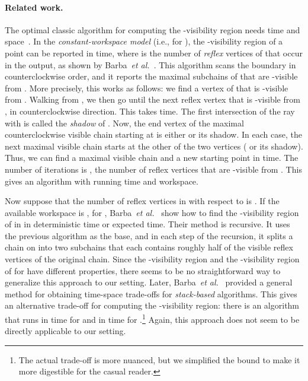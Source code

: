 \documentclass[11pt, a4paper]{article}
\newcommand{\etal}{\emph{et al.}\xspace}
\begin{document}
\paragraph{Related work.}
The optimal classic algorithm for computing the 
-visibility region needs  time and  
space~\cite{joe1987corrections}. In the 
\emph{constant-workspace model} (i.e., for ), the
-visibility region of a point  can
be reported in  time, where 
 is the number of \emph{reflex} vertices 
of  that occur in the output,
as shown by Barba~\etal~\cite{barba2014computing}.
This algorithm scans the boundary 
in counterclockwise order, and it reports the 
maximal subchains of  that are 
-visible from . More precisely, this 
works as follows: we find a vertex
 of  that is -visible 
from . Walking from , we 
then go until the next reflex vertex
 that is -visible from ,
in counterclockwise direction.
This takes  time. The first intersection 
of the ray  with  is 
called the \emph{shadow} of . 
Now, the end vertex of the maximal counterclockwise 
visible chain starting at  is either 
 or its shadow. In each case, 
the next maximal visible chain starts at the other
of the two vertices ( or its shadow). Thus, we  can
find a maximal visible chain and a new starting 
point in  time. 
The number of iterations is , the number 
of reflex vertices that are -visible from .
This gives an algorithm with  running 
time and  workspace. 

Now suppose that the number of reflex vertices in
 with respect to  is . If the 
available workspace is , for 
, Barba~\etal~\cite{barba2014computing} 
show how to find the -visibility region 
of  in  in  
deterministic time or  
expected time. Their method is recursive. 
It uses the previous algorithm as the base,
and in each step of the recursion, it splits a 
chain on  into two subchains that each 
contains roughly half of the visible reflex vertices 
of the original chain. Since the -visibility region 
and the -visibility region of  for  have 
different properties, there seems to be no 
straightforward way to generalize this approach
to our setting.
Later, Barba~\etal~\cite{barba2015space} provided
a general method for obtaining time-space trade-offs for
\emph{stack-based} algorithms. 
This gives an alternative trade-off for 
computing the -visibility region:
there is an algorithm that 
runs in  
time for  and 
in  time for .\footnote{The 
actual trade-off is more nuanced, 
but we simplified the bound to make it more digestible for the
casual reader.}
Again,
this approach does not seem to be directly applicable
to our setting.
\end{document}
